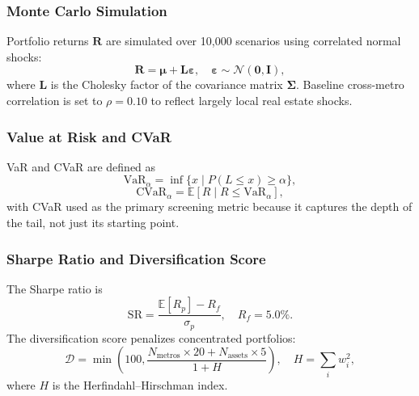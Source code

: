 \documentclass[11pt,letterpaper]{article}
\begin{document}
\subsubsection{Monte Carlo Simulation}

Portfolio returns $\mathbf{R}$ are simulated over 10{,}000 scenarios using correlated
normal shocks:
\begin{equation}
\mathbf{R} = \boldsymbol{\mu} + \mathbf{L}\boldsymbol{\varepsilon},
\quad \boldsymbol{\varepsilon} \sim \mathcal{N}(\mathbf{0},\mathbf{I}),
\label{eq:mc}
\end{equation}
where $\mathbf{L}$ is the Cholesky factor of the covariance matrix $\boldsymbol{\Sigma}$.
Baseline cross-metro correlation is set to $\rho = 0.10$ to reflect largely local real
estate shocks.

\subsubsection{Value at Risk and CVaR}

VaR and CVaR are defined as
\begin{equation}
\text{VaR}_\alpha = \inf\{x \mid P(L \leq x) \geq \alpha\},
\label{eq:var}
\end{equation}
\begin{equation}
\text{CVaR}_\alpha = \mathbb{E}[R \mid R \leq \text{VaR}_\alpha],
\label{eq:cvar}
\end{equation}
with CVaR used as the primary screening metric because it captures the depth of the tail,
not just its starting point.

\subsubsection{Sharpe Ratio and Diversification Score}

The Sharpe ratio is
\begin{equation}
\text{SR} = \frac{\mathbb{E}[R_p] - R_f}{\sigma_p}, \quad R_f = 5.0\%.
\label{eq:sharpe}
\end{equation}
The diversification score penalizes concentrated portfolios:
\begin{equation}
\mathcal{D} =
\min\!\left(100,\frac{N_{\text{metros}}\times 20 + N_{\text{assets}}\times 5}{1+H}\right),
\quad H = \sum_i w_i^2,
\label{eq:div_score}
\end{equation}
where $H$ is the Herfindahl--Hirschman index.

\end{document}
